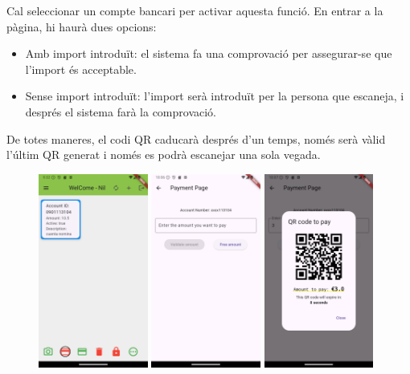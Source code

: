 \documentclass[a4paper,12pt,twoside]{ThesisStyle}
\begin{document}
Cal seleccionar un compte bancari per activar aquesta funció. En entrar a la pàgina, hi haurà dues opcions:

\begin{itemize} 
    \item Amb import introduït: el sistema fa una comprovació per assegurar-se que l'import és acceptable. 
    \item Sense import introduït: l'import serà introduït per la persona que escaneja, i després el sistema farà la comprovació. 
\end{itemize}

De totes maneres, el codi QR caducarà després d'un temps, només serà vàlid l'últim QR generat i només es podrà escanejar una sola vegada.

\begin{figure}[h]
    \centering
    \includegraphics[width=0.32\textwidth]{imatges/mainpageAccount2.png}
    \includegraphics[width=0.32\textwidth]{imatges/paymentPage.png}
    \includegraphics[width=0.32\textwidth]{imatges/paymentPageWithValue.png}

\end{figure}
\end{document}
